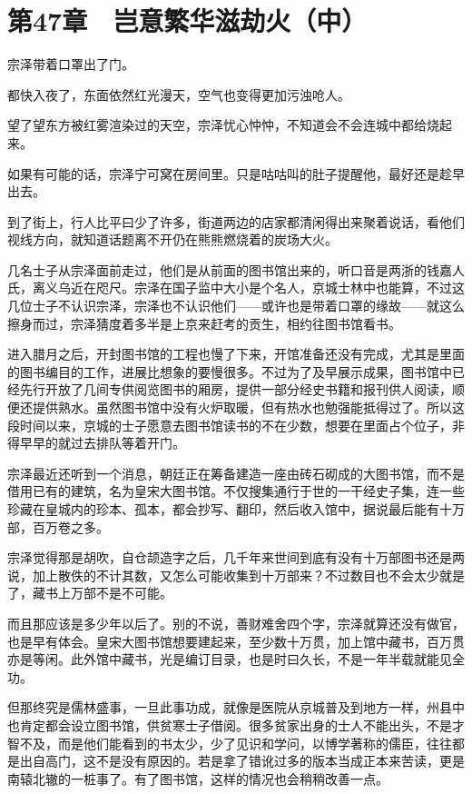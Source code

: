 \section{第47章　岂意繁华滋劫火（中）}

宗泽带着口罩出了门。

都快入夜了，东面依然红光漫天，空气也变得更加污浊呛人。

望了望东方被红雾渲染过的天空，宗泽忧心忡忡，不知道会不会连城中都给烧起来。

如果有可能的话，宗泽宁可窝在房间里。只是咕咕叫的肚子提醒他，最好还是趁早出去。

到了街上，行人比平曰少了许多，街道两边的店家都清闲得出来聚着说话，看他们视线方向，就知道话题离不开仍在熊熊燃烧着的炭场大火。

几名士子从宗泽面前走过，他们是从前面的图书馆出来的，听口音是两浙的钱嘉人氏，离义乌近在咫尺。宗泽在国子监中大小是个名人，京城士林中也能算，不过这几位士子不认识宗泽，宗泽也不认识他们——或许也是带着口罩的缘故——就这么擦身而过，宗泽猜度着多半是上京来赶考的贡生，相约往图书馆看书。

进入腊月之后，开封图书馆的工程也慢了下来，开馆准备还没有完成，尤其是里面的图书编目的工作，进展比想象的要慢很多。不过为了及早展示成果，图书馆中已经先行开放了几间专供阅览图书的厢房，提供一部分经史书籍和报刊供人阅读，顺便还提供熟水。虽然图书馆中没有火炉取暖，但有热水也勉强能抵得过了。所以这段时间以来，京城的士子愿意去图书馆读书的不在少数，想要在里面占个位子，非得早早的就过去排队等着开门。

宗泽最近还听到一个消息，朝廷正在筹备建造一座由砖石砌成的大图书馆，而不是借用已有的建筑，名为皇宋大图书馆。不仅搜集通行于世的一干经史子集，连一些珍藏在皇城内的珍本、孤本，都会抄写、翻印，然后收入馆中，据说最后能有十万部，百万卷之多。

宗泽觉得那是胡吹，自仓颉造字之后，几千年来世间到底有没有十万部图书还是两说，加上散佚的不计其数，又怎么可能收集到十万部来？不过数目也不会太少就是了，藏书上万部不是不可能。

而且那应该是多少年以后了。别的不说，善财难舍四个字，宗泽就算还没有做官，也是早有体会。皇宋大图书馆想要建起来，至少数十万贯，加上馆中藏书，百万贯亦是等闲。此外馆中藏书，光是编订目录，也是时曰久长，不是一年半载就能见全功。

但那终究是儒林盛事，一旦此事功成，就像是医院从京城普及到地方一样，州县中也肯定都会设立图书馆，供贫寒士子借阅。很多贫家出身的士人不能出头，不是才智不及，而是他们能看到的书太少，少了见识和学问，以博学著称的儒臣，往往都是出自高门，这不是没有原因的。若是拿了错讹过多的版本当成正本来苦读，更是南辕北辙的一桩事了。有了图书馆，这样的情况也会稍稍改善一点。

